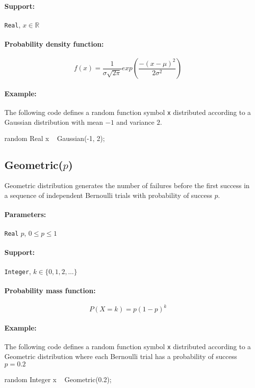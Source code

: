 \paragraph*{Support:} \verb|Real|, $x \in \mathbb{R}$ 

\paragraph*{Probability density function:}
\[
	f(x) = \frac{1}{\sigma \sqrt{2 \pi}} exp(\frac{-(x-\mu)^{2}}{2 \sigma^{2}})
\]

\paragraph*{Example:}
The following code defines a random function symbol \verb|x| distributed according to a Gaussian distribution with mean $-1$ and variance $2$.
\begin{blogcode}
random Real x ~ Gaussian(-1, 2);
\end{blogcode}

\subsection{Geometric($p$)}
Geometric distribution generates the number of failures before the first success in a sequence of independent Bernoulli trials with probability of success $p$.

\paragraph*{Parameters:} 
\begin{itemize*}
\item[] \verb|Real|
 $p$, $0 \leq p \leq 1$ 
\end{itemize*}
\paragraph*{Support:} \verb|Integer|, $k \in \{0, 1, 2, \ldots \}$ 

\paragraph*{Probability mass function:}
\[
	P(X = k) = p(1-p)^{k}
\]

\paragraph*{Example:}
The following code defines a random function symbol \verb|x| distributed according to a Geometric distribution where each Bernoulli trial has a probability of success $p = 0.2$
\begin{blogcode}
random Integer x ~ Geometric(0.2);
\end{blogcode}

